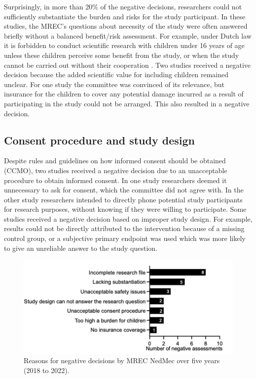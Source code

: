 \documentclass[authordate, empirical]{jote-new-article}
\begin{document}
	Surprisingly, in more than 20\% of the negative decisions, researchers could not sufficiently substantiate the burden and risks for the study participant. In these studies, the MREC's questions about necessity of the study were often answered briefly without a balanced benefit/risk assessment. For example, under Dutch law it is forbidden to conduct scientific research with children under 16 years of age unless these children perceive some benefit from the study, or when the study cannot be carried out without their cooperation \parencites{NederlandseOverheid2022}. Two studies received a negative decision because the added scientific value for including children remained unclear. For one study the committee was convinced of its relevance, but insurance for the children to cover any potential damage incurred as a result of participating in the study could not be arranged. This also resulted in a negative decision.







	\subsection{Consent procedure and study design}



	Despite rules and guidelines on how informed consent should be obtained (CCMO), two studies received a negative decision due to an unacceptable procedure to obtain informed consent. In one study researchers deemed it unnecessary to ask for consent, which the committee did not agree with. In the other study researchers intended to directly phone potential study participants for research purposes, without knowing if they were willing to participate. Some studies received a negative decision based on improper study design. For example, results could not be directly attributed to the intervention because of a missing control group, or a subjective primary endpoint was used which was more likely to give an unreliable answer to the study question.



	\begin{figure}
	
		\includegraphics[width=\linewidth]{media/Picture3.png}

		\caption{Reasons for negative decisions by MREC NedMec over five years (2018 to 2022).}

		\label{fig:rId13}

	
	\end{figure}
\end{document}
